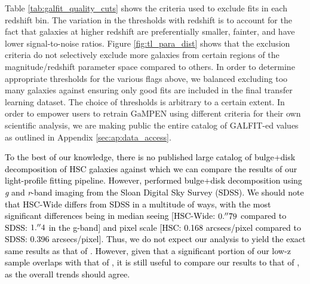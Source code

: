 \documentclass[linenumbers,twocolumn,twocolappendix]{aastex631}
\newcommand\gampen{GaMPEN}
\newcommand\gb{\textit{g}}
\newcommand\rb{\textit{r}}
\begin{document}
\begin{CJK*}{UTF8}{gbsn}
Table \ref{tab:galfit_quality_cuts} shows the criteria used to exclude fits in each redshift bin. The variation in the thresholds with redshift is to account for the fact that galaxies at higher redshift are preferentially smaller, fainter, and have lower signal-to-noise ratios. Figure \ref{fig:tl_para_dist} shows that the exclusion criteria do not selectively exclude more galaxies from certain regions of the magnitude/redshift parameter space compared to others. In order to determine appropriate thresholds for the various flags above, we balanced excluding too many galaxies against ensuring only good fits are included in the final transfer learning dataset. The choice of thresholds is arbitrary to a certain extent. In order to empower users to retrain \gampen{} using different criteria for their own scientific analysis, we are making public the entire catalog of GALFIT-ed values as outlined in Appendix \ref{sec:ap:data_access}.


\textcolor{black}{To the best of our knowledge, there is no published large catalog of bulge+disk decomposition of HSC galaxies against which we can compare the results of our light-profile fitting pipeline. However, \citet{simard_11} performed bulge+disk decomposition using \gb{} and \rb{}-band imaging from the Sloan Digital Sky Survey (SDSS). We should note that HSC-Wide differs from SDSS in a multitude of ways, with the most significant differences being in median seeing [HSC-Wide: $0.\mbox{$^{\prime\prime}$}79$ compared to SDSS: $1.\mbox{$^{\prime\prime}$}4$ in the g-band] and pixel scale [HSC: 0.168 arcsecs/pixel compared to SDSS: 0.396 arcsecs/pixel]. Thus, we do not expect our analysis to yield the exact same results as that of \citet{simard_11}. However, given that a significant portion of our low-z sample overlaps with that of \citet{simard_11}, it is still useful to compare our results to that of \citet{simard_11}, as the overall trends should agree.}


\end{CJK*}
\end{document}
